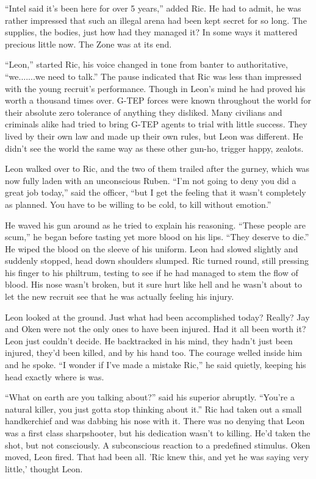 ``Intel said it's been here for over 5 years,''  added Ric.  He had to admit, he was rather impressed that such an illegal arena had been kept secret for so long.  The supplies, the bodies, just how had they managed it?  In some ways it mattered precious little now.  The Zone was at its end.

``Leon,'' started Ric, his voice changed in tone from banter to authoritative, ``we.......we need to talk.''  The pause indicated that Ric was less than impressed with the young recruit's performance.  Though in Leon's mind he had proved his worth a thousand times over.  G-TEP forces were known throughout the world for their absolute zero tolerance of anything they disliked.  Many civilians and criminals alike had tried to bring G-TEP agents to trial with little success.  They lived by their own law and made up their own rules, but Leon was different.  He didn't see the world the same way as these other gun-ho, trigger happy, zealots.  

Leon walked over to Ric, and the two of them trailed after the gurney, which was now fully laden with an unconscious Ruben.  ``I'm not going to deny you did a great job today,'' said the officer, ``but I get the feeling that it wasn't completely as planned.  You have to be willing to be cold, to kill without emotion.''  

He waved his gun around as he tried to explain his reasoning.  ``These people are scum,'' he began before tasting yet more blood on his lips.  ``They deserve to die.''  He wiped the blood on the sleeve of his uniform.  Leon had slowed slightly and suddenly stopped, head down shoulders slumped.  Ric turned round, still pressing his finger to his philtrum, testing to see if he had managed to stem the flow of blood.  His nose wasn't broken, but it sure hurt like hell and he wasn't about to let the new recruit see that he was actually feeling his injury.

Leon looked at the ground.  Just what had been accomplished today?  Really?  Jay and Oken were not the only ones to have been injured.  Had it all been worth it?  Leon just couldn't decide.  He backtracked in his mind, they hadn't just been injured, they'd been killed, and by his hand too.  The courage welled inside him and he spoke.  ``I wonder if I've made a mistake Ric,'' he said quietly, keeping his head exactly where is was.

``What on earth are you talking about?'' said his superior abruptly.  ``You're a natural killer, you just gotta stop thinking about it.''  Ric had taken out a small handkerchief and was dabbing his nose with it.  There was no denying that Leon was a first class sharpshooter, but his dedication wasn't to killing.  He'd taken the shot, but not consciously.  A subconscious reaction to a predefined stimulus.  Oken moved, Leon fired.  That had been all.  'Ric knew this, and yet he was saying very little,' thought Leon.  

